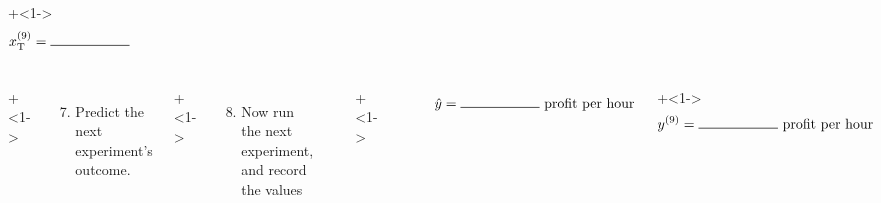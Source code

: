 \documentclass[handout,11pt,aspectratio=169,mathserif]{beamer}
\begin{document}
\begin{frame}
\begin{columns}[T]
			\vspace{-1.3cm}
			\onslide+<1->{	
				\begin{align*} 
					x_\text{T}^{(9)} &= \rule{2cm}{.5pt}~~~~~~~~~~~~~~~~~~~
				\end{align*}
			}
	\end{columns}
	
	\vspace{-0.3cm}
	\begin{columns}[T]

			\vspace{0cm}
			\onslide+<1->{
				{\tiny 
					\begin{enumerate}\setcounter{enumi}{6}
						\item	Predict the next experiment's outcome.
					\end{enumerate}
				
				\par}
			}
			
			\vspace{0cm}
			\onslide+<1->{
				{\tiny 
					\begin{enumerate}\setcounter{enumi}{7}
						\item	Now run the next experiment, and record the values
					\end{enumerate}
				
				\par}
			}
			
			\rule[3mm]{0.01cm}{85mm}%
			
			
			\onslide+<1->{	
				\hrule
				
				\begin{align*}
					~~~\hat{y}  = \rule{2cm}{.5pt} ~\text{profit per hour} 
				\end{align*}
			}
			
			\vspace{-1.15cm}
			\onslide+<1->{	
				\begin{align*}
					y^{(9)} &=  \rule{2cm}{.5pt} ~\text{profit per hour}
				\end{align*}
			}
	\end{columns}
	
\end{frame}
\end{document}
